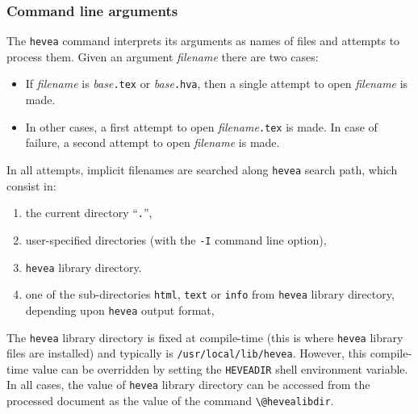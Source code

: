 \subsubsection{Command line arguments}\label{comline}
The \texttt{hevea} command interprets its arguments as names of
files and attempts to process them.
Given an argument \textit{filename} there are two cases:
\begin{itemize}
\item If \textit{filename} is \textit{base}\texttt{.tex} or
\textit{base}\texttt{.hva},
then a single attempt to open \textit{filename} is made.
\item In other cases,
a first attempt to open \textit{filename}\texttt{.tex} is made.
In case of failure, a second attempt to open  \textit{filename} is made.
\end{itemize}
\label{search:path}
In all attempts, implicit filenames are
searched along \texttt{hevea} search path, which consist in:
\begin{enumerate}
\item the current directory ``\texttt{.}'',
\item user-specified directories (with the \texttt{-I} command line
option),
\item \texttt{hevea} library directory.
\item one of the sub-directories \texttt{html}, \texttt{text} or
\texttt{info} from \texttt{hevea} library directory, depending upon
\texttt{hevea} output format,
\end{enumerate}
The \texttt{hevea} library directory is fixed at compile-time
(this is where \texttt{hevea} library files are installed)
and typically is \texttt{/usr/local/lib/hevea}.
However, this compile-time value can be overridden
by setting the \texttt{HEVEADIR} shell environment variable.
In all cases, the value of \texttt{hevea} library directory can
be accessed from the processed document as the value of the command
\verb+\@hevealibdir+.



